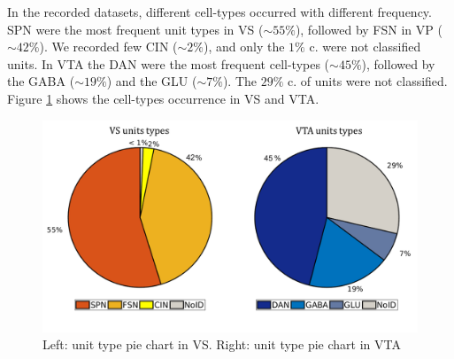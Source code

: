 \pagebreak
In the recorded datasets, different cell-types occurred with different frequency. SPN were the most frequent unit types in VS ($\sim55\%$), followed by FSN in VP ($\sim42\%$). We recorded few CIN ($\sim2\%$), and only the $1\%$ c. were not classified units. In VTA the DAN were the most frequent cell-types ($\sim45\%$), followed by the GABA ($\sim19\%$) and the GLU ($\sim7\%$). The $29\%$ c. of units were not classified. Figure \ref{fig:PieRegions} shows the cell-types occurrence in VS and VTA.
\begin{figure}[H]
  \centering
    \includegraphics[scale=0.5]{figures/PieRegions1.png}
   \caption{Left: unit type pie chart in VS. Right: unit type pie chart in VTA}
    \label{fig:PieRegions}
\end{figure}

